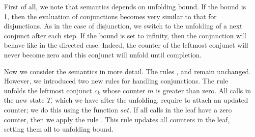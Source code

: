 First of all, we note that semantics depends on unfolding bound. If the bound is 1, then the evaluation of conjunctions becomes very similar to that for disjunctions. As in the case of
disjunction, we switch to the unfolding of a next conjunct after each step. If the bound is set to infinity, then the conjunction will behave like in the directed case. Indeed,
the counter of the leftmost conjunct will never become zero and this conjunct will unfold until completion.

Now we consider the semantics in more detail. The rules ,  and  remain unchanged. However, we introduced two new rules for handling conjunctions.
The rule  unfolds the leftmost conjunct $c_k$ whose counter $m$ is greater than zero. All calls in the new state $T$, which we have after the unfolding,
require to attach an updated counter; we do this using the function $set$. If all calls in the leaf have a zero counter, then we apply the rule .
This rule updates all counters in the leaf, setting them all to unfolding bound.

